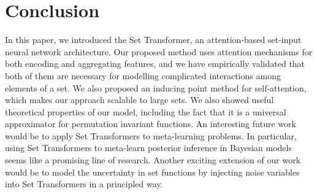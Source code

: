 \section{Conclusion}
\label{sec:conclusion}

In this paper, we introduced the Set Transformer, an attention-based set-input neural network architecture.
Our proposed method uses attention mechanisms for both encoding and aggregating features, and we have empirically validated that both of them are necessary for modelling complicated interactions among elements of a set.
We also proposed an inducing point method for self-attention, which makes our approach scalable to large sets.
We also showed useful theoretical properties of our model, including the fact that it is a universal approximator for permutation invariant functions.
An interesting future work would be to apply Set Transformers to meta-learning problems. In particular, using Set Transformers to meta-learn posterior inference in Bayesian models seems like a promising line of research. Another exciting extension of our work would be to model the uncertainty in set functions by injecting noise variables into Set Transformers in a principled way.
